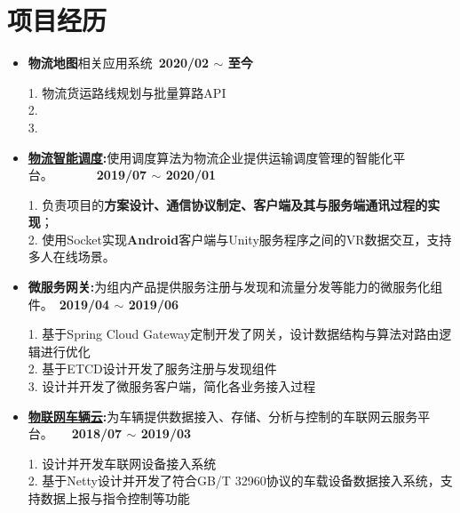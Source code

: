 \documentclass[letterpaper, UTF8, 11pt]{article}
\begin{document}
	\section*{\textbf{项目经历}}\vspace{-0.12in}
	\begin{itemize}	
		\item \textbf{物流地图}{相关应用系统}~\textbf{2020/02 $\sim$ 至今}
		
		1. 物流货运路线规划与批量算路API\\
		2. \\
		3. 
		
		\vspace{0.03in}

		\item \textbf{\href{https://lbsyun.baidu.com/solutions/scheduling}{物流智能调度}:}{使用调度算法为物流企业提供运输调度管理的智能化平台。}~~~~~~~\textbf{2019/07 $\sim$ 2020/01}
		
		1. 负责项目的\textbf{方案设计、通信协议制定、客户端及其与服务端通讯过程的实现}；\\
		2. 使用Socket实现\textbf{Android}客户端与Unity服务程序之间的VR数据交互，支持多人在线场景。
		
		\vspace{0.03in}

		\item \textbf{微服务网关:}{为组内产品提供服务注册与发现和流量分发等能力的微服务化组件。}~\textbf{2019/04 $\sim$ 2019/06}
		
		1. 基于Spring Cloud Gateway定制开发了网关，设计数据结构与算法对路由逻辑进行优化\\
		2. 基于ETCD设计开发了服务注册与发现组件\\
		3. 设计并开发了微服务客户端，简化各业务接入过程
		
		\vspace{0.03in}
		
		\item \textbf{\href{https://cloud.baidu.com/product/dugo.html}{物联网车辆云}:}{为车辆提供数据接入、存储、分析与控制的车联网云服务平台。}~~~\textbf{2018/07 $\sim$ 2019/03}
		
		1. 设计并开发车联网设备接入系统\\
		2. 基于Netty设计并开发了符合GB/T 32960协议的车载设备数据接入系统，支持数据上报与指令控制等功能
		
		\vspace{0.03in}
		
	\end{itemize}
	\vspace{-0.32in}
\end{document}
